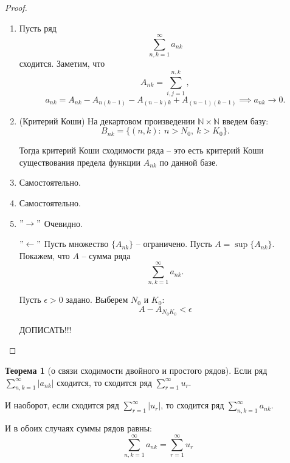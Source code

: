 \documentclass{report}
\theoremstyle{definition}
\newtheorem{theorem}{Теорема}[section]
\begin{document}
\begin{proof}
  \begin{enumerate}
    \item Пусть ряд
          \begin{equation*}
            \sum_{n,k=1}^{\infty}a_{nk}
          \end{equation*}
          сходится. Заметим, что
          \begin{equation*}
            A_{nk} = \sum_{i,j=1}^{n,k},
          \end{equation*}
          \begin{equation*}
            a_{nk} = A_{nk} - A_{n(k-1)} - A_{(n-k)k} + A_{(n-1)(k-1)} \implies a_{nk} \rightarrow 0.
          \end{equation*}

    \item (Критерий Коши)
          На декартовом произведении $\mathbb{N}\times\mathbb{N}$ введем базу:
          \begin{equation*}
            B_{nk} = \{(n,k): \ n > N_0, \ k > K_0\}.
          \end{equation*}

          Тогда критерий Коши сходимости ряда -- это есть критерий Коши существования предела функции $A_{nk}$ по данной базе.

    \item Самостоятельно.

    \item Самостоятельно.

    \item $"\rightarrow"$ Очевидно.

          $"\leftarrow"$ Пусть множество $\{A_{nk}\}$ -- ограничено. Пусть $A = \sup\{A_{nk}\}$. Покажем, что $A$ -- сумма ряда
          \begin{equation*}
            \sum_{n,k=1}^{\infty}a_{nk}.
          \end{equation*}

          Пусть $\epsilon > 0$ задано. Выберем $N_0$ и $K_0$:
          \begin{equation*}
            A - A_{N_0 K_0} < \epsilon
          \end{equation*}

          ДОПИСАТЬ!!!
  \end{enumerate}
\end{proof}

\begin{theorem}[о связи сходимости двойного и простого рядов]
  Если ряд $\sum_{n,k=1}^{\infty}|a_{nk}|$ сходится, то сходится ряд $\sum_{r=1}^{\infty}u_r$.

  И наоборот, если сходится ряд $\sum_{r=1}^{\infty}|u_r|$, то сходится ряд $\sum_{n,k=1}^{\infty}a_{nk}$.

  И в обоих случаях суммы рядов равны:
  \begin{equation*}
    \sum_{n,k=1}^{\infty}a_{nk} = \sum_{r=1}^{\infty}u_r
  \end{equation*}
\end{theorem}
\end{document}
